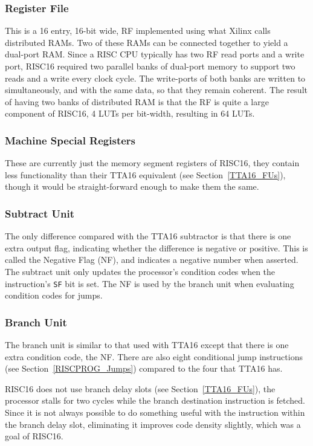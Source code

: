 \subsubsection{Register File}
\label{RISC16_RF}
This is a 16 entry, 16-bit wide, RF implemented using what Xilinx calls
distributed RAMs. Two of these RAMs can be connected together to yield a
dual-port RAM. Since a RISC CPU typically has two RF read ports and a write port,
RISC16 required two parallel banks of dual-port memory to support two reads and a
write every clock cycle. The write-ports of both banks are written to
simultaneously, and with the same data, so that they remain coherent. The result
of having two banks of distributed RAM is that the RF is quite a large component
of RISC16, 4 LUTs per bit-width, resulting in 64 LUTs.

\subsubsection{Machine Special Registers}
These are currently just the memory segment registers of RISC16, they contain
less functionality than their TTA16 equivalent (see Section~\ref{TTA16_FUs}),
though it would be straight-forward enough to make them the same.

\subsubsection{Subtract Unit}
The only difference compared with the TTA16 subtractor is that there is one extra
output flag, indicating whether the difference is negative or positive. This is
called the Negative Flag (NF), and indicates a negative number when asserted. The
subtract unit only updates the processor's condition codes when the instruction's
\texttt{SF} bit is set. The NF is used by the branch unit when evaluating
condition codes for jumps.

\subsubsection{Branch Unit}
The branch unit is similar to that used with TTA16 except that there is one extra
condition code, the NF. There are also eight conditional jump instructions (see
Section~\ref{RISCPROG_Jumps}) compared to the four that TTA16 has.

RISC16 does not use branch delay slots (see Section~\ref{TTA16_FUs}), the
processor stalls for two cycles while the branch destination instruction is
fetched. Since it is not always possible to do something useful with the
instruction within the branch delay slot, eliminating it improves code density
slightly, which was a goal of RISC16.

